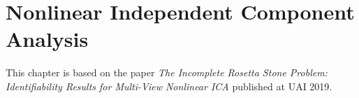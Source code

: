 \chapter{Nonlinear Independent Component Analysis}

\ifpdf
    \graphicspath{{Chapter4/Figs/Raster/}{Chapter4/Figs/PDF/}{Chapter4/Figs/}}
\else
    \graphicspath{{Chapter4/Figs/Vector/}{Chapter4/Figs/}}
\fi

This chapter is based on the paper \emph{The Incomplete Rosetta Stone Problem: Identifiability Results for Multi-View Nonlinear ICA} published at UAI 2019.
